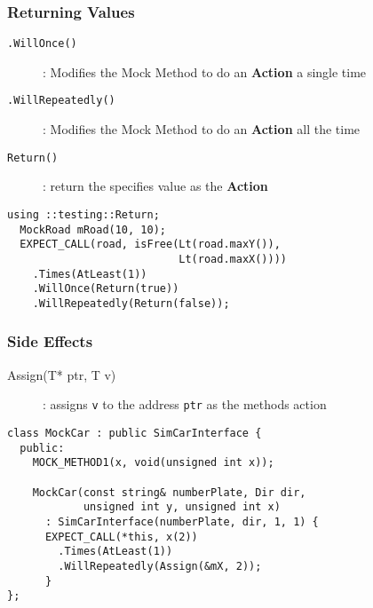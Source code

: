 \documentclass{beamer}
\begin{document}
\begin{frame}[fragile]
  \frametitle{Returning Values}
  \begin{description}
    \item[\tt .WillOnce()]: Modifies the Mock Method to do an {\bf Action} a single time
    \item[\tt .WillRepeatedly()]: Modifies the Mock Method to do an {\bf Action} all the time
    \item[\tt Return()]: return the specifies value as the {\bf Action}
  \end{description}

  \begin{lstlisting}[title=Example of a Return Action, style=code, basicstyle=\ttfamily\footnotesize\color{white}]
  using ::testing::Return;
  MockRoad mRoad(10, 10);
  EXPECT_CALL(road, isFree(Lt(road.maxY()),
                           Lt(road.maxX())))
    .Times(AtLeast(1))
    .WillOnce(Return(true))
    .WillRepeatedly(Return(false));
  \end{lstlisting}
\end{frame}


\begin{frame}[fragile]
  \frametitle{Side Effects}
  \begin{description}
    \item[Assign(T* ptr, T v)]: assigns {\tt v} to the address {\tt ptr} as  the methods action
  \end{description}
  \begin{lstlisting}[title=Example of a Side-Effect Action, style=code, basicstyle=\ttfamily\footnotesize\color{white}]
class MockCar : public SimCarInterface {
  public:
    MOCK_METHOD1(x, void(unsigned int x));

    MockCar(const string& numberPlate, Dir dir, 
            unsigned int y, unsigned int x)
      : SimCarInterface(numberPlate, dir, 1, 1) {
      EXPECT_CALL(*this, x(2))
        .Times(AtLeast(1))
        .WillRepeatedly(Assign(&mX, 2));
      }
};
  \end{lstlisting}
\end{frame}
\end{document}
